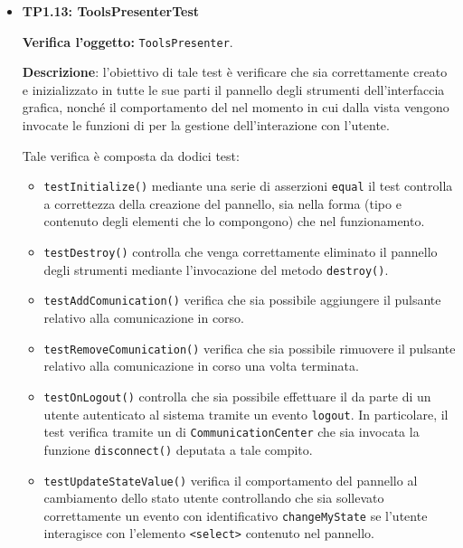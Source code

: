 \begin{itemize}
\begin{itemize}
\end{itemize}

\item[\passed] \textbf{TP1.13: ToolsPresenterTest}

\textbf{Verifica l'oggetto:} \texttt{ToolsPresenter}.

\textbf{Descrizione}: l'obiettivo di tale test è verificare che sia correttamente creato e inizializzato in tutte le sue parti il pannello degli strumenti dell'interfaccia grafica, nonché il comportamento del  nel momento in cui dalla vista vengono invocate le funzioni di  per la gestione dell'interazione con l'utente.

Tale verifica è composta da dodici test:
\begin{itemize}

\item \texttt{testInitialize()} mediante una serie di asserzioni \texttt{equal} il test controlla a correttezza della creazione del pannello, sia nella forma  (tipo e contenuto degli elementi che lo compongono) che nel funzionamento.

\item \texttt{testDestroy()} controlla che venga correttamente eliminato il pannello degli strumenti mediante l'invocazione del metodo \verb'destroy()'.

\item \texttt{testAddComunication()} verifica che sia possibile aggiungere il pulsante relativo alla comunicazione in corso.

\item \texttt{testRemoveComunication()} verifica che sia possibile rimuovere il pulsante relativo alla comunicazione in corso una volta terminata.

\item \texttt{testOnLogout()} controlla che sia possibile effettuare il  da parte di un utente autenticato al sistema tramite un evento \verb'logout'. In particolare, il test verifica tramite un  di \verb'CommunicationCenter' che sia invocata la funzione \verb'disconnect()' deputata a tale compito.

\item \texttt{testUpdateStateValue()} verifica il comportamento del pannello al cambiamento dello stato utente controllando che sia sollevato correttamente un evento con identificativo \verb'changeMyState' se l'utente interagisce con l'elemento \verb'<select>' contenuto nel pannello.


\end{itemize}
\end{itemize}
